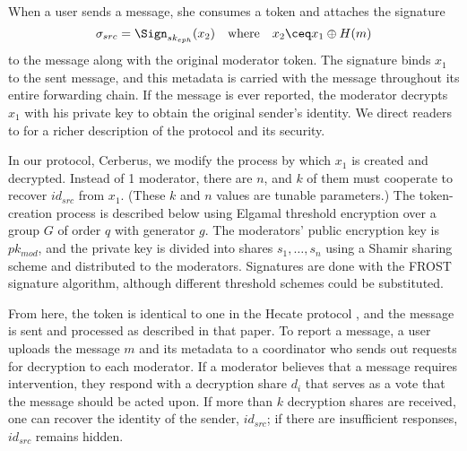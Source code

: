 \documentclass[conference]{IEEEtran}
\begin{document}
When a user sends a message, she consumes a token and attaches the signature
\begin{equation}
	\sigma_{src} = \Sign_{sk_{eph}}(x_2)
	\quad \text{where} \quad
	x_2 \ceq x_1 \oplus H(m)
\end{equation}
to the message along with the original moderator token.
The signature binds $x_1$ to the sent message, and this metadata is carried with the message throughout its entire forwarding chain.
If the message is ever reported, the moderator decrypts $x_1$ with his private key to obtain the original sender's identity.
We direct readers to \textcite{hecate} for a richer description of the protocol and its security.

In our protocol, Cerberus, we modify the process by which $x_1$ is created and decrypted.
Instead of 1 moderator, there are $n$, and $k$ of them must cooperate to recover $id_{src}$ from $x_1$.
(These $k$ and $n$ values are tunable parameters.)
The token-creation process is described below using Elgamal threshold encryption over a group $G$ of order $q$ with generator $g$.
The moderators' public encryption key is $pk_{mod}$, and the private key is divided into shares $s_1, \ldots, s_n$ using a Shamir sharing scheme \cite{shamir-secret-sharing} and distributed to the moderators.
Signatures are done with the FROST \cite{frost} signature algorithm, although different threshold schemes could be substituted.

\smallskip

\begin{algorithmic}[1]
\end{algorithmic}

\smallskip

From here, the token is identical to one in the Hecate protocol \cite{hecate}, and the message is sent and processed as described in that paper.
To report a message, a user uploads the message $m$ and its metadata to a coordinator who sends out requests for decryption to each moderator.
If a moderator believes that a message requires intervention, they respond with a decryption share $d_i$ that serves as a vote that the message should be acted upon.
If more than $k$ decryption shares are received, one can recover the identity of the sender, $id_{src}$; if there are insufficient responses, $id_{src}$ remains hidden.
\end{document}
